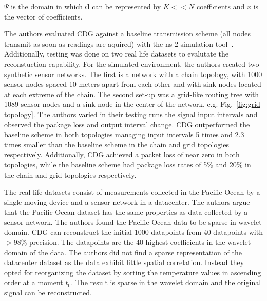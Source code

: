 $ \Psi $ is the domain in which \textbf{d} can be represented by $ K << N
$ coefficients and $ x $ is the vector of coefficients.

The authors evaluated \ac{CDG} against a baseline transmission scheme (all
nodes transmit as soon as readings are aquired) with the ns-2 simulation
tool~\cite{bajaj1999improving}. Additionally, testing was done on two real life
datasets to evalutate the reconstuction capability. For the simulated
environment, the authors created two synthetic sensor networks. The first is a
network with a chain topology, with 1000 sensor nodes spaced 10 meters apart
from each other and with sink nodes located at each extreme of the chain. The
second set-up was a grid-like routing tree with 1089 sensor nodes and a sink
node in the center of the network, e.g. Fig.~\ref{fig:grid topology}. The
authors varied in their testing runs the signal input intervals and observed
the package loss and output interval change. \ac{CDG} outperformed the baseline
scheme in both topologies managing input intervals 5 times and 2.3 times
smaller than the baseline scheme in the chain and grid topologies respectively.
Additionally, \ac{CDG} achieved a packet loss of near zero in both topologies,
while the baseline scheme had package loss rates of 5\% and 20\% in the chain
and grid topologies respectively.

The real life datasets consist of measurements collected in the Pacific Ocean
by a single moving device and a sensor network in a datacenter. The authors
argue that the Pacific Ocean dataset has the same properties as data collected
by a sensor network. The authors found the Pacific Ocean data to be sparse in
wavelet domain. \ac{CDG} can reconstruct the initial 1000 datapoints from 40
datapoints with $ > 98\% $ precision. The datapoints are the 40 highest
coefficients in the wavelet domain of the data. The authors did not find a
sparse representation of the datacenter dataset as the data exhibit little
spatial correlation. Instead they opted for reorganizing the dataset by sorting
the temperature values in ascending order at a moment $ t_0 $. The result is
sparse in the wavelet domain and the original signal can be reconstructed.


\par

